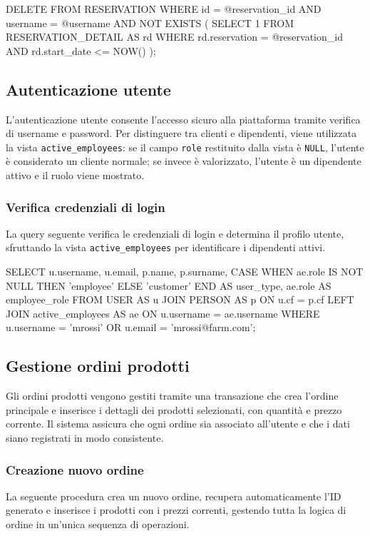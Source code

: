 \documentclass[a4paper,12pt]{report}
\begin{document}
\begin{sqlcode}[caption={}]
DELETE FROM RESERVATION
WHERE
  id = @reservation_id
  AND username = @username
  AND NOT EXISTS (
    SELECT 1
    FROM RESERVATION_DETAIL AS rd
    WHERE
      rd.reservation = @reservation_id
      AND rd.start_date <= NOW()
  );
\end{sqlcode}

\newpage
\subsection{Autenticazione utente}
L'autenticazione utente consente l'accesso sicuro alla piattaforma
tramite verifica di username e password. Per distinguere tra clienti
e dipendenti, viene utilizzata la vista \texttt{active\_employees}:
se il campo \texttt{role} restituito dalla vista è \texttt{NULL},
l'utente è considerato un cliente normale; se invece è valorizzato,
l'utente è un dipendente attivo e il ruolo viene mostrato.

\subsubsection{Verifica credenziali di login}
La query seguente verifica le credenziali di login e determina il
profilo utente, sfruttando la vista \texttt{active\_employees} per
identificare i dipendenti attivi.

\begin{sqlcode}[caption={}]
SELECT
  u.username,
  u.email,
  p.name,
  p.surname,
  CASE WHEN ae.role IS NOT NULL THEN 'employee' ELSE 'customer' END AS user_type,
  ae.role AS employee_role
FROM USER AS u
JOIN PERSON AS p ON u.cf = p.cf
LEFT JOIN active_employees AS ae ON u.username = ae.username
WHERE u.username = 'mrossi' OR u.email = 'mrossi@farm.com';
\end{sqlcode}

\newpage
\subsection{Gestione ordini prodotti}
Gli ordini prodotti vengono gestiti tramite una transazione che crea
l'ordine principale e inserisce i dettagli dei prodotti selezionati,
con quantità e prezzo corrente. Il sistema assicura che ogni ordine
sia associato all'utente e che i dati siano registrati in modo consistente.

\subsubsection{Creazione nuovo ordine}
La seguente procedura crea un nuovo ordine, recupera automaticamente
l'ID generato e inserisce i prodotti con i prezzi correnti, gestendo
tutta la logica di ordine in un'unica sequenza di operazioni.
\end{document}

